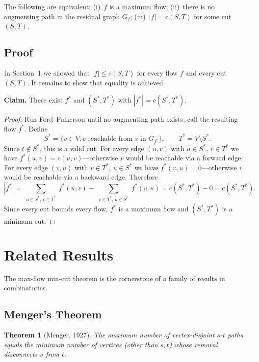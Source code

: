 \documentclass[11pt]{article}
\newtheorem{theorem}{Theorem}
\begin{document}
The following are equivalent: (i)~$f$ is a maximum flow;
(ii)~there is no augmenting path in the residual graph $G_f$;
(iii)~$|f| = c(S,T)$ for some cut $(S,T)$.

\subsection{Proof}

In Section~1 we showed that $|f| \le c(S,T)$ for every flow $f$
and every cut $(S,T)$.  It remains to show that equality is
achieved.

\textbf{Claim.} There exist $f^*$ and $(S^*,T^*)$ with
$|f^*| = c(S^*,T^*)$.

\begin{proof}
Run Ford--Fulkerson until no augmenting path exists; call the
resulting flow $f^*$.  Define
\[
  S^* = \{v \in V : v \text{ reachable from } s \text{ in }
        G_{f^*}\}, \qquad T^* = V \setminus S^*.
\]
Since $t \notin S^*$, this is a valid cut.  For every edge
$(u,v)$ with $u \in S^*$, $v \in T^*$ we have
$f^*(u,v) = c(u,v)$---otherwise $v$ would be reachable via a
forward edge.  For every edge $(v,u)$ with $v \in T^*$,
$u \in S^*$ we have $f^*(v,u) = 0$---otherwise $v$ would be
reachable via a backward edge.  Therefore
\[
  |f^*|
  = \sum_{\substack{u \in S^*,\, v \in T^*}} f^*(u,v)
  - \sum_{\substack{v \in T^*,\, u \in S^*}} f^*(v,u)
  = c(S^*,T^*) - 0
  = c(S^*,T^*).
\]
Since every cut bounds every flow, $f^*$ is a maximum flow and
$(S^*,T^*)$ is a minimum cut.
\end{proof}

\section{Related Results}

The max-flow min-cut theorem is the cornerstone of a family of
results in combinatorics.

\subsection{Menger's Theorem}

\begin{theorem}[Menger, 1927]
The maximum number of vertex-disjoint $s$-$t$ paths equals the
minimum number of vertices (other than $s,t$) whose removal
disconnects $s$ from $t$.
\end{theorem}
\end{document}
